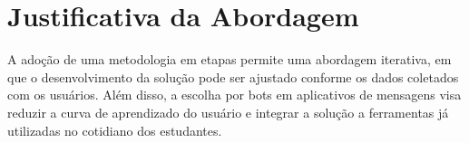\section{Justificativa da Abordagem}

A adoção de uma metodologia em etapas permite uma abordagem iterativa, em que o desenvolvimento da solução pode ser ajustado conforme os dados coletados com os usuários. Além disso, a escolha por bots em aplicativos de mensagens visa reduzir a curva de aprendizado do usuário e integrar a solução a ferramentas já utilizadas no cotidiano dos estudantes.

